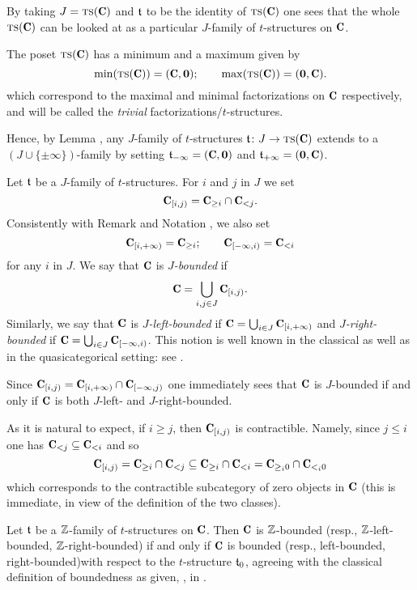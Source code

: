 \documentclass[a4paper,12pt]{amsart}
\begin{document}
\begin{example}
By taking $J=\ts(\C)$ and $\mathfrak{t}$ to be the identity of $\ts(\C)$ one sees that the whole $\ts(\C)$ can be looked at as a particular $J$-family of $t$-structures on $\C$.
\end{example}
\begin{remark}\label{infinity}
The poset $\ts(\C)$ has a minimum and a maximum given by
\[
\min(\ts(\C))=(\C,\mathbf{0});\qquad \max(\ts(\C))=(\mathbf{0},\C).
\]
which correspond to the maximal and minimal factorizations on $\C$ respectively, and will be called the \emph{trivial} factorizations\fshyp{}$t$-structures. 

Hence, by Lemma , any $J$-family of $t$-structures $\tee\colon J\to \ts(\C)$ extends to a $(J\cup\{\pm\infty\})$-family by setting $\tee_{-\infty}=(\C,\mathbf{0})$ and $\tee_{+\infty}=(\mathbf{0},\C)$. 
\end{remark}
\begin{definition}\label{std.endocardium}
Let $\mathfrak{t}$ be a $J$-family of $t$-structures. For $i$ and $j$ in $J$ we set
\[
\C_{[i,j)}=\C_{\geq i}\cap \C_{<j}.
\]
Consistently with Remark  and Notation , we also set
\[
\C_{[i,+\infty)}=\C_{\geq i};\qquad \C_{[-\infty,i)}= \C_{<i}
\]
for any $i$ in $J$. We say that $\C$ is \emph{$J$-bounded} if 
\[
\C=\bigcup_{i,j\in J}\C_{[i,j)}.
\]
Similarly, we say that $\C$ is \emph{$J$-left-bounded} if $\C=\bigcup_{i\in J}\C_{[i,+\infty)}$ and \emph{$J$-right-bounded} if $\C=\bigcup_{i\in J}\C_{[-\infty,i)}$. This notion is well known in the classical as well as in the quasicategorical setting: see \cite{BBDPervers,LurieHA}.
\end{definition}
\begin{remark}
Since $\C_{[i,j)}=\C_{[i,+\infty)}\cap \C_{[-\infty,j)}$ one immediately sees that $\C$ is $J$-bounded if and only if $\C$ is both $J$-left- and $J$-right-bounded.
\end{remark}
\begin{remark}
As it is natural to expect, if $i\geq j$, then $\C_{[i,j)}$ is contractible. Namely, since $j\leq i$ one has $\C_{<j}\subseteq \C_{<i}$ and so 
\[
\C_{[i,j)}=\C_{\geq i}\cap \C_{<j}\subseteq \C_{\geq i}\cap \C_{<i}=\C_{\geq_i0}\cap \C_{<_i0}
\]
which corresponds to the contractible subcategory of zero objects in $\C$ (this is immediate, in view of the definition of the two classes).
\end{remark}
\begin{remark}
Let $\mathfrak{t}$ be a $\mathbb{Z} $-family of $t$-structures on $\C$. Then $\C$ is $\mathbb{Z} $-bounded (resp., $\mathbb{Z} $-left-bounded, $\mathbb{Z} $-right-bounded) if and only if $\C$ is bounded (resp., left-bounded, right-bounded)with respect to the $t$-structure $\mathfrak{t}_0$, agreeing with the classical definition of boundedness as given, \eg, in \cite{BBDPervers}.
\end{remark}
\end{document}
